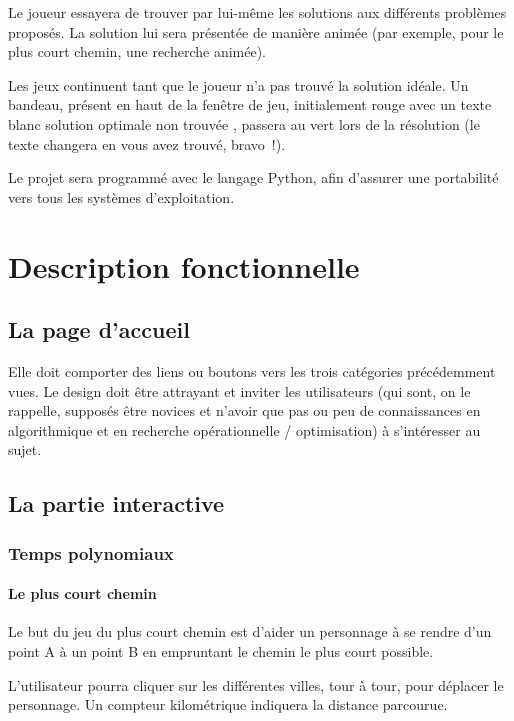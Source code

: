\documentclass[12pt]{report}
\begin{document}
 Le joueur essayera de trouver par lui-même les solutions aux différents
  problèmes proposés. La solution lui sera présentée de manière animée
  (par exemple, pour le plus court chemin, une recherche animée).
 
 Les jeux continuent tant que le joueur n'a pas trouvé la solution idéale.
  Un bandeau, présent en haut de la fenêtre de jeu, initialement rouge avec
  un texte blanc \og solution optimale non trouvée \fg, passera au vert
  lors de la résolution (le texte changera en \og vous avez trouvé, bravo~!\fg).

 Le projet sera programmé avec le langage Python, afin d'assurer une portabilité
  vers tous les systèmes d'exploitation.

 \section{Description fonctionnelle}
 
 \subsection{La page d'accueil}
 
  Elle doit comporter des liens ou boutons vers les trois catégories
   précédemment vues. Le design doit être attrayant et inviter les
   utilisateurs (qui sont, on le rappelle, supposés être novices et
   n'avoir que pas ou peu de connaissances en algorithmique et en
   recherche opérationnelle / optimisation) à s'intéresser au sujet.
  
  \subsection{La partie interactive}
  
  \subsubsection{Temps polynomiaux}
  
  \paragraph{Le plus court chemin}
  
  Le but du jeu du plus court chemin est d'aider un personnage à se
   rendre d'un point A à un point B en empruntant le chemin le plus
   court possible.
  
  L'utilisateur pourra cliquer sur les différentes villes, tour à tour,
   pour déplacer le personnage. Un compteur kilométrique indiquera la
   distance parcourue.
  
\end{document}
